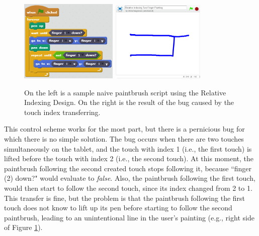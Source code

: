 \begin{figure}
\centering
\includegraphics[width=0.415\textwidth]{images/NaiveTwoFingerPaintingRID.PNG}
\includegraphics[width=0.4\textwidth]{images/IndexTransferLineBug.PNG}
\caption[Sample Naive Script For Two-Finger Painting Using the Relative Indexing Design ]{On the left is a sample naive paintbrush script using the Relative Indexing Design. On the right is the result of the bug caused by the touch index transferring.}
\label{NaiveTwoFingerPaintingRID}
\end{figure}

This control scheme works for the most part, but there is a pernicious bug for which there is no simple solution. The bug occurs when there are two touches simultaneously on the tablet, and the touch with index 1 (i.e., the first touch) is lifted before the touch with index 2 (i.e., the second touch). At this moment, the paintbrush following the second created touch stops following it, because ``finger (2) down?" would evaluate to \emph{false}. Also, the paintbrush following the first touch, would then start to follow the second touch, since its index changed from 2 to 1. This transfer is fine, but the problem is that the paintbrush following the first touch does not know to lift up its pen before starting to follow the second paintbrush, leading to an unintentional line in the user's painting (e.g., right side of Figure \ref{NaiveTwoFingerPaintingRID}). 

